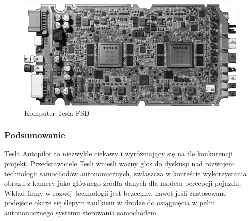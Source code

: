 \begin{figure}[h]
\begin{center}
\includegraphics[width=15cm]{resources/figures/tesla_fsd.png}
\caption{Komputer Tesla FSD}
\end{center}
\end{figure}

\vspace{-0.7cm}
\subsubsection{Podsumowanie}
Tesla Autopilot to niezwykle ciekawy i wyróżniający się na tle konkurencji projekt. Przedstawiciele Tesli wnieśli ważny głos do dyskusji nad rozwojem technologii samochodów autonomicznych, zwłaszcza w konteście wykorzystania obrazu z kamery jako głównego źródła danych dla modelu percepcji pojazdu. Wkład firmy w rozwój technologii jest bezcenny, nawet jeśli zastosowane podejście okaże się ślepym zaułkiem w drodze do osiągnięcia w pełni autonomicznego systemu sterowania samochodem.